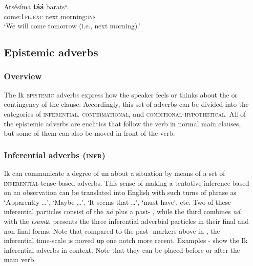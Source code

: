 \ea\label{ex:adv:8}
\gll Atsésíma     \textbf{táá}   baratsᵒ. \\
come:\textsc{1pl.exc}   next   morning:\textsc{ins}    \\
\glt ‘We will come tomorrow (i.e., next morning).’ 
\z






\subsection{Epistemic adverbs}\label{sec:9.4}
\subsubsection{Overview}\label{sec:9.4.1}

The Ik \textsc{epistemic} adverbs express how the speaker feels or thinks about the  or contingency of the clause. Accordingly, this set of adverbs can be divided into the categories of \textsc{inferential}, \textsc{confirmational}, and \textsc{conditional-hypothetical}. All of the epistemic adverbs are enclitics that follow the verb in normal main clauses, but some of them can also be moved in front of the verb.


\subsubsection{Inferential adverbs (\textsc{infr})}\label{sec:9.4.2}

Ik can communicate a degree of un about a situation by means of a set of \textsc{inferential} tense-based adverbs. This sense of making a tentative inference based on an observation can be translated into English with such turns of phrase as ‘Apparently {\dots}’, ‘Maybe {\dots}’, ‘It seems that {\dots}’, ‘must have’, etc. Two of these inferential particles consist of the  \textit{ná} plus a past- , while the third combines \textit{ná} with the  \textit{tsamʉ}.  presents the three inferential adverbial particles in their final and non-final forms. Note that compared to the past- markers above in , the inferential time-scale is moved up one notch more recent. Examples - show the Ik inferential adverbs in context. Note that they can be placed before or after the main verb.


